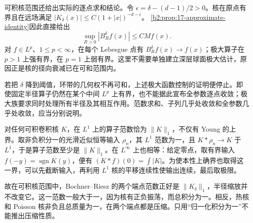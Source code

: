 可积核范围还给出实际的逐点求和结论。令
\(\epsilon=\delta-(d-1)/2>0\)。核在原点有界且在远场满足
\(|K_\delta(x)|\leq C(1+|x|)^{-d-\epsilon}\)。
\cref{b2:prop:17-approximate-identity}因此直接给出
\[
 \sup_{R>0}|B_R^\delta f(x)|\leq C Mf(x).
\]
对 \(f\in L^p\)、\(1\leq p<\infty\)，在每个 Lebesgue 点有 \(B_R^\delta f(x)\to f(x)\)；极大算子在 \(p>1\) 上强有界，在 \(p=1\) 上弱有界。这里不需要单独建立深层球面极大估计，原因正是核的径向衰减已在可和范围内。

\ProseParagraphBreak

若把 \(\delta\) 降到阈值，环带的几何权不再可和，上述极大函数控制的证明便停止。即使固定半径算子仍然在某个中间 \(L^p\) 上有界，也不能据此宣布全参数逐点收敛；极大族要求同时处理所有半径及其相互作用。范数求和、子列几乎处收敛和全参数几乎处收敛，应当分别说明。

\ProseParagraphBreak

对任何可积卷积核 \(K\)，在 \(L^1\) 上的算子范数恰为 \(\|K\|_1\)，不仅有 Young 的上界。取非负积分一的光滑近似恒等输入 \(\rho_n\)，其 \(L^1\) 范数为一，且 \(K*\rho_n\to K\) 于 \(L^1\)，于是算子范数至少是 \(\|K\|_1\)。在 \(L^\infty\) 上也相等：给定零点，取有界输入 \(f(-y)=\overline{\operatorname{sgn}K(y)}\)，便有 \((K*f)(0)=\int|K|\)。为使本性上确界也取得这一界，可以先截断输入，再利用 \(L^1\) 核的平移连续性使输出连续，最后取极限。

\ProseParagraphBreak

故在可积核范围中，Bochner--Riesz 的两个端点范数正好是 \(\|K_\delta\|_1\)，半径缩放并不改变它。这一范数一般大于一，因为核有正负振荡，而总积分为一。相反，热核和 Poisson 核非负且总质量为一，在两个端点都是压缩。只用“归一化积分为一”不能推出压缩性质。
